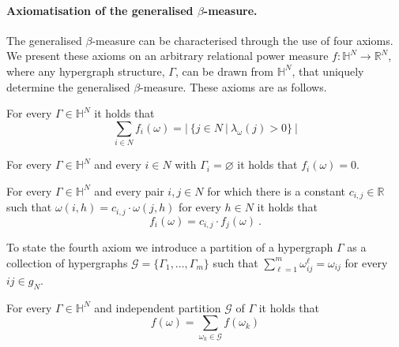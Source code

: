 \paragraph{Axiomatisation of the generalised $\beta$-measure.}

The generalised $\beta$-measure can be characterised through the use of four axioms. We present these axioms on an arbitrary relational power measure $f : \mathbb{H}^{N} \rightarrow \mathbb{R}^{N}$, where any hypergraph structure, $\Gamma$, can be drawn from $\mathbb{H}^{N}$, that uniquely determine the generalised $\beta$-measure. These axioms are as follows.

\begin{axiom} \label{ax:1}
For every $\Gamma \in \mathbb{H}^{N}$ it holds that
\[
\sum_{i \in N} f_{i}(\omega) = | ~ \{ j \in N ~ | ~ \lambda_{\omega}(j) > 0 \} ~ |
\]
\end{axiom}

\begin{axiom} \label{ax:2}
For every $\Gamma \in \mathbb{H}^{N}$ and every $i \in N$ with $\Gamma_{i} = \varnothing$ it holds that $f_{i}(\omega) = 0$.
\end{axiom}

\begin{axiom} \label{ax:3}
For every $\Gamma \in \mathbb{H}^{N}$ and every pair $i,j \in N$ for which there is a constant $c_{i,j} \in \mathbb{R}$ such that $\omega(i,h) = c_{i,j} \cdot \omega(j,h)$ for every $h \in N$ it holds that
\begin{equation}
f_{i}(\omega) = c_{i,j} \cdot f_{j}(\omega) ~ .
\end{equation}
\end{axiom}

To state the fourth axiom we introduce a partition of a hypergraph $\Gamma$ as a collection of hypergraphs $\mathcal{G} = \{\Gamma_{1}, \ldots, \Gamma_{m}\}$ such that $\sum_{\ell = 1}^{m} \omega_{ij}^{\ell} = \omega_{ij}$ for every $ij \in g_{N}$.


\begin{axiom} \label{ax:4}
For every $\Gamma \in \mathbb{H}^{N}$ and independent partition $\mathcal{G}$ of $\Gamma$ it holds that
\begin{equation}
f(\omega) = \sum_{\omega_{k} \in \mathcal{G}} f(\omega_{k})
\end{equation}
\end{axiom}

